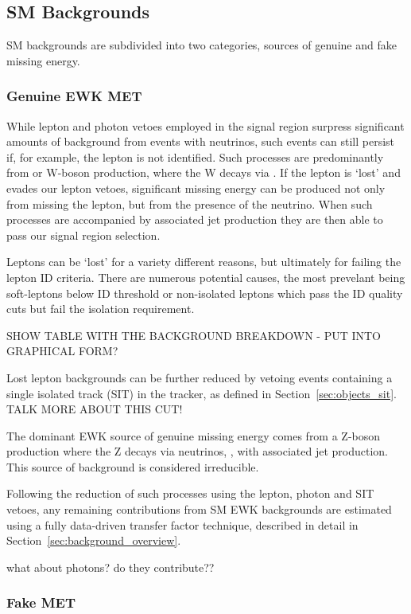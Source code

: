 \subsection{SM Backgrounds}
SM backgrounds are subdivided into two categories, sources of genuine and fake 
missing energy.

\subsubsection{Genuine EWK MET}
While lepton and photon vetoes employed in the signal region surpress 
significant amounts of background from events with neutrinos, such events can 
still persist if, for example, the lepton is not identified.
Such processes are predominantly from \ttbar or W-boson production, where the 
W decays via \wlnu. If the lepton is `lost' and evades our 
lepton vetoes, significant missing energy can be produced not only from missing 
the lepton, but from the presence of the neutrino. When such processes are accompanied 
by associated jet production they are then able to pass our signal region selection.

Leptons can be `lost' for a variety different reasons, but ultimately for failing
the lepton ID criteria. There are numerous potential causes, the 
most prevelant being soft-leptons below ID threshold or non-isolated leptons 
which pass the ID quality cuts but fail the isolation requirement.

SHOW TABLE WITH THE BACKGROUND BREAKDOWN - PUT INTO GRAPHICAL FORM?

Lost lepton backgrounds can be further reduced by vetoing events containing a single 
isolated track (SIT) in the tracker, as defined in Section~\ref{sec:objects_sit}. TALK 
MORE ABOUT THIS CUT!

The dominant EWK source of genuine missing energy comes from a Z-boson 
production where the Z decays
via neutrinos, \zinv, with associated jet production. This source of background
is considered irreducible.

Following the reduction of such processes using the lepton, photon and SIT vetoes,
any remaining contributions from SM EWK backgrounds are estimated using a 
fully data-driven transfer factor technique, described in detail in
Section~\ref{sec:background_overview}.

what about photons? do they contribute??

\subsubsection{Fake MET}

